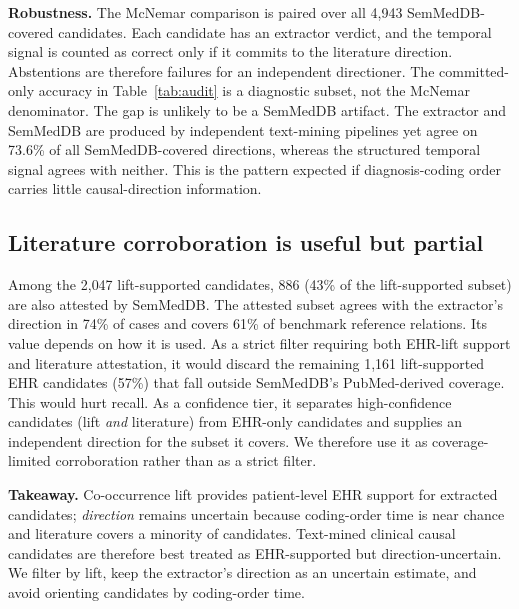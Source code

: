 \documentclass[runningheads]{llncs}
\begin{document}
\noindent\textbf{Robustness.} 
The McNemar comparison is paired over all 4{,}943 SemMedDB-covered candidates. Each candidate has an extractor verdict, and the temporal signal is counted as correct only if it commits to the literature direction. Abstentions are therefore failures for an independent directioner. The committed-only accuracy in Table~\ref{tab:audit} is a diagnostic subset, not the McNemar denominator. The gap is unlikely to be a SemMedDB artifact. The extractor and SemMedDB are produced by independent text-mining pipelines yet agree on 73.6\% of all SemMedDB-covered directions, whereas the structured temporal signal agrees with neither. This is the pattern expected if diagnosis-coding order carries little causal-direction information.

\subsection{Literature corroboration is useful but partial}
Among the 2{,}047 lift-supported candidates, 886 (43\% of the lift-supported subset) are also attested by SemMedDB. The attested subset agrees with the extractor's direction in 74\% of cases and covers 61\% of benchmark reference relations. Its value depends on how it is used. As a strict filter requiring both EHR-lift support and literature attestation, it would discard the remaining 1{,}161 lift-supported EHR candidates (57\%) that fall outside SemMedDB's PubMed-derived coverage. This would hurt recall. As a confidence tier, it separates high-confidence candidates (lift \emph{and} literature) from EHR-only candidates and supplies an independent direction for the subset it covers. We therefore use it as coverage-limited corroboration rather than as a strict filter.

\smallskip\noindent\textbf{Takeaway.} Co-occurrence lift provides patient-level EHR support for extracted candidates; \emph{direction} remains uncertain because coding-order time is near chance and literature covers a minority of candidates. Text-mined clinical causal candidates are therefore best treated as EHR-supported but direction-uncertain. We filter by lift, keep the extractor's direction as an uncertain estimate, and avoid orienting candidates by coding-order time.
\end{document}

